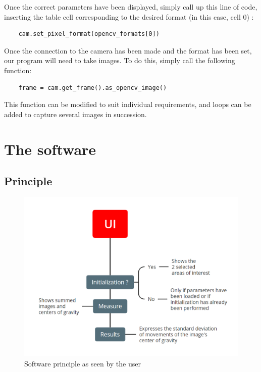Once the correct parameters have been displayed, simply call up this line of code, inserting the table cell corresponding 
to the desired format (in this case, cell 0) :
\begin{verbatim}
    cam.set_pixel_format(opencv_formats[0])
\end{verbatim}
Once the connection to the camera has been made and the format has been set, our program will need to take images.
To do this, simply call the following function:
\begin{verbatim}
    frame = cam.get_frame().as_opencv_image()
\end{verbatim}
This function can be modified to suit individual requirements, and loops can be added to capture several images in succession.
\newpage
\section{The software}
\subsection{Principle}
\begin{figure}[H]
    \centering
    \includegraphics[scale=0.85]{assets/figures/Software/General.png}
    \caption{Software principle as seen by the user}
    \label{fig:Soft_General}
\end{figure}
